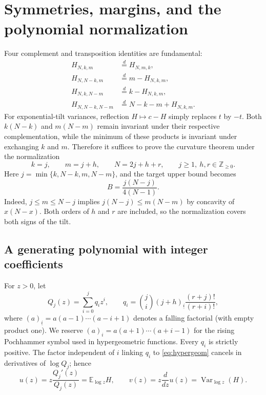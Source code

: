 \documentclass[11pt,a4paper]{article}
\DeclareMathOperator{\Var}{Var}\DeclareMathOperator{\Cov}{Cov}\DeclareMathOperator{\Hyp}{Hyp}\DeclareMathOperator{\Bern}{Bern}\DeclareMathOperator{\supp}{supp}\DeclareMathOperator{\artanh}{artanh}
\newcommand{\E}{\mathbb E}\newcommand{\R}{\mathbb R}\newcommand{\N}{\mathbb N}\newcommand{\one}{\mathbf1}
\begin{document}


\section{Symmetries, margins, and the polynomial normalization}\label{sec:reductions}
Four complement and transposition identities are fundamental:
\begin{align}
 H_{N,k,m}&\stackrel d=H_{N,m,k},\label{eq:sym1}\\
 H_{N,N-k,m}&\stackrel d=m-H_{N,k,m},\label{eq:sym2}\\
 H_{N,k,N-m}&\stackrel d=k-H_{N,k,m},\label{eq:sym3}\\
 H_{N,N-k,N-m}&\stackrel d=N-k-m+H_{N,k,m}.\label{eq:sym4}
\end{align}
For exponential-tilt variances, reflection $H\mapsto c-H$ simply replaces $t$ by $-t$. Both $k(N-k)$ and $m(N-m)$ remain invariant under their respective complementation, while the minimum of these products is invariant under exchanging $k$ and $m$. Therefore it suffices to prove the curvature theorem under the normalization
\begin{equation}\label{eq:param}
 k=j,\qquad m=j+h,\qquad N=2j+h+r,
 \qquad j\ge1,\ h,r\in\mathbb Z_{\ge0}.
\end{equation}
Here $j=\min\{k,N-k,m,N-m\}$, and the target upper bound becomes
\begin{equation}\label{eq:Bdef}
 B=\frac{j(N-j)}{4(N-1)}.
\end{equation}
Indeed, $j\le m\le N-j$ implies $j(N-j)\le m(N-m)$ by concavity of $x(N-x)$. Both orders of $h$ and $r$ are included, so the normalization covers both signs of the tilt.

\subsection{A generating polynomial with integer coefficients}
For $z>0$, let
\begin{equation}\label{eq:Q}
 Q_j(z)=\sum_{i=0}^j q_i z^i,
 \qquad
 q_i=\binom ji (j+h)_{\underline i}
 \frac{(r+j)!}{(r+i)!},
\end{equation}
where $(a)_{\underline i}=a(a-1)\cdots(a-i+1)$ denotes a falling factorial (with empty product one). We reserve $(a)_i=a(a+1)\cdots(a+i-1)$ for the rising Pochhammer symbol used in hypergeometric functions. Every $q_i$ is strictly positive. The factor independent of $i$ linking $q_i$ to \eqref{eq:hypergeom} cancels in derivatives of $\log Q_j$; hence
\begin{equation}\label{eq:tiltuv}
 u(z)=z\frac{Q_j'(z)}{Q_j(z)}=\E_{\log z}H,
 \qquad
 v(z)=z\frac{d}{dz}u(z)=\Var_{\log z}(H).
\end{equation}
\end{document}
